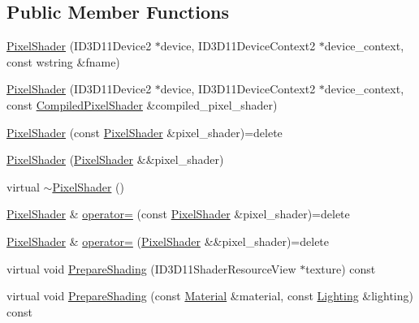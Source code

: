 \subsection*{Public Member Functions}
\begin{DoxyCompactItemize}
\item 
\hyperlink{classmage_1_1_pixel_shader_a0e8952d69f42380d289e7b4bb8035b3e}{Pixel\+Shader} (I\+D3\+D11\+Device2 $\ast$device, I\+D3\+D11\+Device\+Context2 $\ast$device\+\_\+context, const wstring \&fname)
\item 
\hyperlink{classmage_1_1_pixel_shader_a6d3bef6c6d0e2b20443eed92788646e2}{Pixel\+Shader} (I\+D3\+D11\+Device2 $\ast$device, I\+D3\+D11\+Device\+Context2 $\ast$device\+\_\+context, const \hyperlink{structmage_1_1_compiled_pixel_shader}{Compiled\+Pixel\+Shader} \&compiled\+\_\+pixel\+\_\+shader)
\item 
\hyperlink{classmage_1_1_pixel_shader_a361df943e40e9015ac4b769af130ce79}{Pixel\+Shader} (const \hyperlink{classmage_1_1_pixel_shader}{Pixel\+Shader} \&pixel\+\_\+shader)=delete
\item 
\hyperlink{classmage_1_1_pixel_shader_a5b2d7d36082d25c6f860674df745f7cd}{Pixel\+Shader} (\hyperlink{classmage_1_1_pixel_shader}{Pixel\+Shader} \&\&pixel\+\_\+shader)
\item 
virtual \hyperlink{classmage_1_1_pixel_shader_aac21a59d5d614f5bf1905f01479de44e}{$\sim$\+Pixel\+Shader} ()
\item 
\hyperlink{classmage_1_1_pixel_shader}{Pixel\+Shader} \& \hyperlink{classmage_1_1_pixel_shader_ac3a3535b2751237f4aad110dca05d0c3}{operator=} (const \hyperlink{classmage_1_1_pixel_shader}{Pixel\+Shader} \&pixel\+\_\+shader)=delete
\item 
\hyperlink{classmage_1_1_pixel_shader}{Pixel\+Shader} \& \hyperlink{classmage_1_1_pixel_shader_aaeab6f6fda7d6e1f7d333da03d58daf9}{operator=} (\hyperlink{classmage_1_1_pixel_shader}{Pixel\+Shader} \&\&pixel\+\_\+shader)=delete
\item 
virtual void \hyperlink{classmage_1_1_pixel_shader_ab677013145ca252c57e5a001134c01ff}{Prepare\+Shading} (I\+D3\+D11\+Shader\+Resource\+View $\ast$texture) const
\item 
virtual void \hyperlink{classmage_1_1_pixel_shader_a5a1a58bcb0ed64405e746ec7a5af5269}{Prepare\+Shading} (const \hyperlink{structmage_1_1_material}{Material} \&material, const \hyperlink{structmage_1_1_lighting}{Lighting} \&lighting) const
\end{DoxyCompactItemize}
